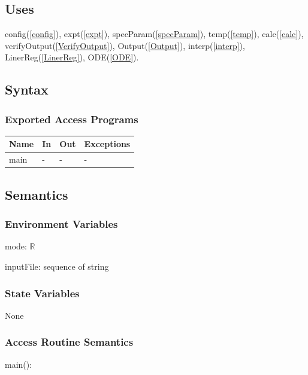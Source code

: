\documentclass[12pt, titlepage]{article}
\begin{document}
\subsection{Uses}

config(\ref{config}), expt(\ref{expt}), specParam(\ref{specParam}),
temp(\ref{temp}), calc(\ref{calc}), verifyOutput(\ref{VerifyOutput}),
Output(\ref{Output}), interp(\ref{interp}),
LinerReg(\ref{LinerReg}), ODE(\ref{ODE}).

\subsection{Syntax}

\subsubsection{Exported Access Programs}

\begin{center}
\begin{tabular}{p{2cm} p{4cm} p{4cm} p{2cm}}
\hline
\textbf{Name} & \textbf{In} & \textbf{Out} & \textbf{Exceptions} \\
\hline
main & - & - & - \\
\hline
\end{tabular}
\end{center}

\subsection{Semantics}

\subsubsection{Environment Variables}

mode: $\mathbb{R}$

inputFile: sequence of string \\ 


\subsubsection{State Variables}

None

\subsubsection{Access Routine Semantics}

\noindent main():
\end{document}
